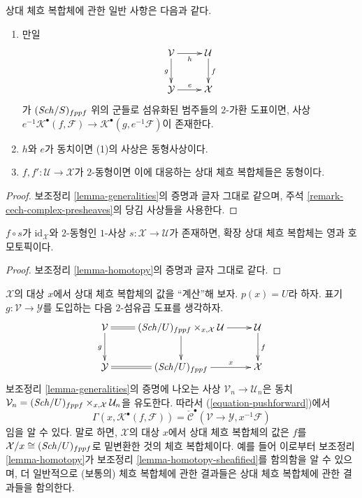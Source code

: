 \begin{lemma}
\label{lemma-generalities-sheafified}
상대 체흐 복합체에 관한 일반 사항은 다음과 같다.
\begin{enumerate}
\item 만일
$$
\xymatrix{
\mathcal{V} \ar[d]_g \ar[r]_h & \mathcal{U} \ar[d]^f \\
\mathcal{Y} \ar[r]^e & \mathcal{X}
}
$$
가 $(\mathit{Sch}/S)_{fppf}$ 위의 군들로 섬유화된 범주들의
$2$-가환 도표이면, 사상
$e^{-1}\mathcal{K}^\bullet(f, \mathcal{F}) \to
\mathcal{K}^\bullet(g, e^{-1}\mathcal{F})$이 존재한다.
\item $h$와 $e$가 동치이면 (1)의 사상은 동형사상이다.
\item $f, f' : \mathcal{U} \to \mathcal{X}$가 $2$-동형이면
이에 대응하는 상대 체흐 복합체들은 동형이다.
\end{enumerate}
\end{lemma}

\begin{proof}
보조정리 \ref{lemma-generalities}의 증명과 글자 그대로 같으며,
주석 \ref{remark-cech-complex-presheaves}의 당김 사상들을 사용한다.
\end{proof}

\begin{lemma}
\label{lemma-homotopy-sheafified}
$f \circ s$가 $\text{id}_\mathcal{X}$와 $2$-동형인 $1$-사상
$s : \mathcal{X} \to \mathcal{U}$가 존재하면,
확장 상대 체흐 복합체는 영과 호모토픽이다.
\end{lemma}

\begin{proof}
보조정리 \ref{lemma-homotopy}의 증명과 글자 그대로 같다.
\end{proof}

\begin{remark}
\label{remark-cech-complex-sections}
$\mathcal{X}$의 대상 $x$에서 상대 체흐 복합체의 값을
``계산''해 보자. $p(x) = U$라 하자.
표기 $g : \mathcal{V} \to \mathcal{Y}$를 도입하는 다음
$2$-섬유곱 도표를 생각하자.
$$
\xymatrix{
\mathcal{V} \ar@{=}[r] \ar[d]_g &
(\Sch/U)_{fppf} \times_{x, \mathcal{X}} \mathcal{U} \ar[r] \ar[d] &
\mathcal{U} \ar[d]^f \\
\mathcal{Y} \ar@{=}[r] &
(\Sch/U)_{fppf} \ar[r]^-x & \mathcal{X}
}
$$
보조정리 \ref{lemma-generalities}의 증명에 나오는 사상
$\mathcal{V}_n \to \mathcal{U}_n$은 동치
$\mathcal{V}_n =
(\mathit{Sch}/U)_{fppf} \times_{x, \mathcal{X}} \mathcal{U}_n$을 유도한다.
따라서 (\ref{equation-pushforward})에서
$$
\Gamma(x, \mathcal{K}^\bullet(f, \mathcal{F})) =
\check{\mathcal{C}}^\bullet(\mathcal{V} \to \mathcal{Y}, x^{-1}\mathcal{F})
$$
임을 알 수 있다. 말로 하면, $\mathcal{X}$의 대상 $x$에서
상대 체흐 복합체의 값은 $f$를
$\mathcal{X}/x \cong (\mathit{Sch}/U)_{fppf}$로 밑변환한 것의 체흐 복합체이다.
예를 들어 이로부터 보조정리 \ref{lemma-homotopy}가
보조정리 \ref{lemma-homotopy-sheafified}를 함의함을 알 수 있으며,
더 일반적으로 (보통의) 체흐 복합체에 관한 결과들은
상대 체흐 복합체에 관한 결과들을 함의한다.
\end{remark}

